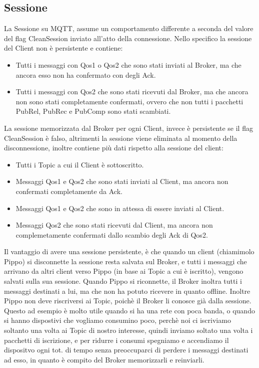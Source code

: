 \documentclass{article}
\begin{document}
\subsection{Sessione}
La Sessione su MQTT, assume un comportamento differente a seconda del valore del flag CleanSession inviato all'atto della connessione. Nello specifico la sessione del Client non è persistente e contiene:
\begin{itemize}
	\item Tutti i messaggi con Qos1 o Qos2 che sono stati inviati al Broker, ma che ancora esso non ha confermato con degli Ack.
	\item Tutti i messaggi con Qos2 che sono stati ricevuti dal Broker, ma che ancora non sono stati completamente confermati, ovvero che non tutti i pacchetti PubRel, PubRec e PubComp sono stati scambiati.
\end{itemize}
La sessione memorizzata dal Broker per ogni Client, invece è persistente se il flag CleanSession è falso, altrimenti la sessione viene eliminata al momento della disconnessione, inoltre contiene più dati rispetto alla sessione del client:
\begin{itemize}
	\item Tutti i Topic a cui il Client è sottoscritto.
	\item Messaggi Qos1 e Qos2 che sono stati inviati al Client, ma ancora non confermati completamente da Ack.
	\item Messaggi Qos1 e Qos2 che sono in attessa di essere inviati al Client.
	\item Messaggi Qos2 che sono stati ricevuti dal Client, ma ancora non complemetamente confermati dallo scambio degli Ack di Qos2.
\end{itemize}
Il vantaggio di avere una sessione persistente, è che quando un client (chiamimolo Pippo) si disconnette la sessione resta salvata sul Broker, e tutti i messaggi che arrivano da altri client verso Pippo (in base ai Topic a cui è iscritto), vengono salvati sulla sua sessione. Quando Pippo si riconnette, il Broker inoltra tutti i messaggi destinati a lui, ma che non ha potuto ricevere in quanto offline. Inoltre Pippo non deve riscriversi ai Topic, poichè il Broker li conosce già dalla sessione. Questo ad esempio è molto utile quando si ha una rete con poca banda, o quando si hanno dispostivi che vogliamo consumino poco, perchè noi ci iscriviamo soltanto una volta ai Topic di nostro interesse, quindi inviamo soltato una volta i pacchetti di iscrizione, e per ridurre i consumi spegniamo e accendiamo il dispositvo ogni tot. di tempo senza preoccuparci di perdere i messaggi destinati ad esso, in quanto è compito del Broker memorizzarli e reinviarli.
\end{document}

